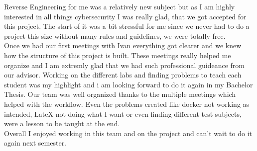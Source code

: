 Reverse Engineering for me was a relatively new subject but as I am highly interested in all things cybersecurity I was really glad, that we got accepted for this project. The start of it was a bit stressful for me since we never had to do a project this size without many rules and guidelines, we were totally free. \\
Once we had our first meetings with Ivan everything got clearer and we knew how the structure of this project is built. These meetings really helped me organize and I am extremly glad that we had such professional guideance from our advisor. Working on the different labs and finding problems to teach each student was my highlight and i am looking forward to do it again in my Bachelor Thesis. Our team was well organized thanks to the multiple meetings which helped with the workflow. Even the problems created like docker not working as intended, LateX not doing what I want or even finding different test subjects, were a lesson to be taught at the end. \\
Overall I enjoyed working in this team and on the project and can't wait to do it again next semester.
